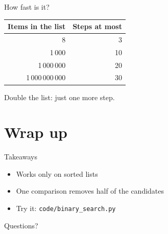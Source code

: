\documentclass[aspectratio=169]{beamer}
\begin{document}
\begin{frame}{How fast is it?}
  \centering
  \begin{tabular}{rr}
    \toprule
    Items in the list & Steps at most \\
    \midrule
    8 & 3 \\
    1\,000 & 10 \\
    1\,000\,000 & 20 \\
    1\,000\,000\,000 & 30 \\
    \bottomrule
  \end{tabular}

  \vspace{1em}
  Double the list: just one more step.
\end{frame}

\section{Wrap up}

\begin{frame}{Takeaways}
  \begin{itemize}
    \item<1-> Works only on \alert{sorted} lists
    \item<2-> One comparison removes half of the candidates
    \item<3-> Try it: \texttt{code/binary\_search.py}
  \end{itemize}
\end{frame}

\begin{frame}[standout]
  Questions?
\end{frame}
\end{document}
